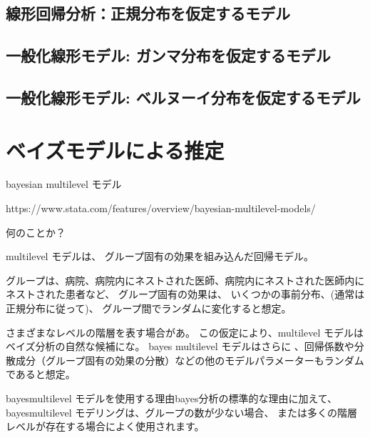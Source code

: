 \documentclass[a4j,11pt,mc]{jreport}
\begin{document}
	\section{線形回帰分析：正規分布を仮定するモデル}



	\section{一般化線形モデル: ガンマ分布を仮定するモデル}


	\section{一般化線形モデル: ベルヌーイ分布を仮定するモデル}

\chapter{ベイズモデルによる推定}\label{chapter:bayes}

	bayesian multilevel モデル

	https://www.stata.com/features/overview/bayesian-multilevel-models/

	何のことか？

	multilevel モデルは、
	グループ固有の効果を組み込んだ回帰モデル。

	グループは、病院、病院内にネストされた医師、病院内にネストされた医師内にネストされた患者など、
	グループ固有の効果は、
	いくつかの事前分布、(通常は正規分布に従って)、
	グループ間でランダムに変化すると想定。


	さまざまなレベルの階層を表す場合があ。
	この仮定により、multilevel モデルはベイズ分析の自然な候補にな。
	bayes multilevel モデルはさらに
	、回帰係数や分散成分（グループ固有の効果の分散）などの他のモデルパラメーターもランダムであると想定。


	bayesmultilevel モデルを使用する理由bayes分析の標準的な理由に加えて、
	bayesmultilevel モデリングは、グループの数が少ない場合、
	または多くの階層レベルが存在する場合によく使用されます。
\end{document}
